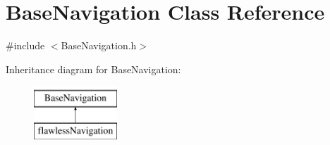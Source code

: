 \hypertarget{class_base_navigation}{}\section{Base\+Navigation Class Reference}
\label{class_base_navigation}


{\ttfamily \#include $<$Base\+Navigation.\+h$>$}

Inheritance diagram for Base\+Navigation\+:\begin{figure}[H]
\begin{center}
\leavevmode
\includegraphics[height=2.000000cm]{class_base_navigation}
\end{center}
\end{figure}
